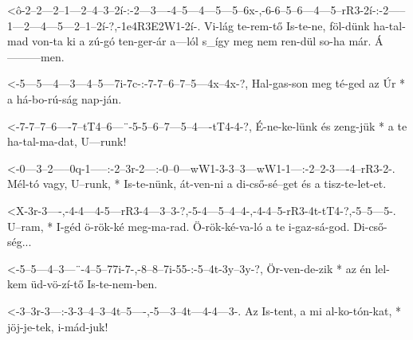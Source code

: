 
  {<ô-2--2---2--1---2--4--3--2í-:-2---3----4--5---4---5---5--6x-,-6-6--5--6---4---5--rR3-2í-:-2-----1---2---4---5---2--1--2í-?,-1e4R3E2W1-2í-.}
  {   Vi-lág te-rem-tő Is-te-ne,  föl-dünk ha-tal-mad von-ta ki   a zú-gó ten-ger-ár a---lól  s_így meg nem ren-dül so-ha már.  Á---------men.}

  {<-5---5---4---3---4--5---7i-7c-:-7-7--6--7--5---4x--4x-?,}
  {  Hal-gas-son meg té-ged az Úr * a há-bo-rú-ság nap-ján.}

  {<-7-7--7--6----7--tT4--6---¨-5-5--6--7---5--4----tT4-4-?,}
  {  É-ne-ke-lünk és zeng-jük * a te ha-tal-ma-dat, U---runk!}

  {<-0---3--2-----0q-1-----:-2--3r-2---:-0--0---wW1-3-3--3---wW1-1---:-2--2-3----4--rR3-2-.}
  {  Mél-tó vagy, U--runk, * Is-te-nünk, át-ven-ni  a di-cső-sé--get   és a tisz-te-let-et.}

  {<X-3r-3----,-4-4---4-5---rR3-4---3--3-?,-5-4---5--4--4-,-4-4--5-rR3-4t-tT4-?,-5--5---5-.}
  {   U--ram, * I-géd ö-rök-ké  meg-ma-rad. Ö-rök-ké-va-ló  a te i-gaz-sá-god.   Di-cső-ség...}

  {<-5--5---4--3---¨-4--5--77i-7-,-8--8--7i-55-:-5--4t-3y--3y-?,}
  {  Ör-ven-de-zik * az én lel-kem üd-vö-zí-tő   Is-te-nem-ben.}



  {<-3--3r-3---:-3-3--4--3--4t--5----,-5---3--4t---4-4---3-.}
  {  Az Is-tent, a mi al-ko-tón-kat, * jöj-je-tek, i-mád-juk!}


